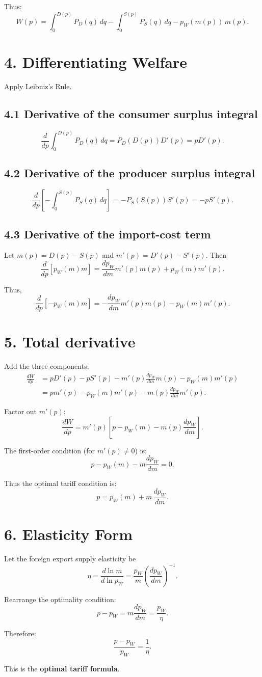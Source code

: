 \documentclass[11pt]{article}
\begin{document}
Thus:
\[
\boxed{
W(p)
= \int_{0}^{D(p)} P_D(q)\,dq
- \int_{0}^{S(p)} P_S(q)\,dq
- p_W(m(p))\, m(p).
}
\]

\section*{4. Differentiating Welfare}

Apply Leibniz's Rule.

\subsection*{4.1 Derivative of the consumer surplus integral}
\[
\frac{d}{dp}\int_{0}^{D(p)}P_D(q)\,dq
= P_D(D(p))D'(p) = pD'(p).
\]

\subsection*{4.2 Derivative of the producer surplus integral}
\[
\frac{d}{dp}\left[-\int_{0}^{S(p)}P_S(q)\,dq\right]
= -P_S(S(p))S'(p)= -pS'(p).
\]

\subsection*{4.3 Derivative of the import-cost term}

Let $m(p)=D(p)-S(p)$ and $m'(p)=D'(p)-S'(p)$. Then
\[
\frac{d}{dp}[p_W(m)m]
= \frac{dp_W}{dm}m'(p)m(p) + p_W(m)m'(p).
\]

Thus,
\[
\frac{d}{dp}[-p_W(m)m]
= -\frac{dp_W}{dm}m'(p)m(p) - p_W(m)m'(p).
\]

\section*{5. Total derivative}

Add the three components:
\begin{align*}
\frac{dW}{dp}
&= pD'(p) - pS'(p)
   - m'(p)\frac{dp_W}{dm}m(p)
   - p_W(m)m'(p) \\
&= p m'(p) - p_W(m)m'(p)
 - m(p)\frac{dp_W}{dm}m'(p).
\end{align*}

Factor out $m'(p)$:
\[
\boxed{
\frac{dW}{dp}
= m'(p)\left[p - p_W(m) - m(p)\frac{dp_W}{dm}\right].
}
\]

The first-order condition (for $m'(p)\neq 0$) is:
\[
p - p_W(m) - m\frac{dp_W}{dm} = 0.
\]

Thus the optimal tariff condition is:
\[
\boxed{
p = p_W(m) + m\,\frac{dp_W}{dm}.
}
\]

\section*{6. Elasticity Form}

Let the foreign export supply elasticity be
\[
\eta
= \frac{d\ln m}{d\ln p_W}
= \frac{p_W}{m}\left(\frac{dp_W}{dm}\right)^{-1}.
\]

Rearrange the optimality condition:
\[
p - p_W = m\frac{dp_W}{dm}
= \frac{p_W}{\eta}.
\]

Therefore:
\[
\boxed{
\frac{p-p_W}{p_W} = \frac{1}{\eta}.
}
\]

This is the \textbf{optimal tariff formula}.
\end{document}
